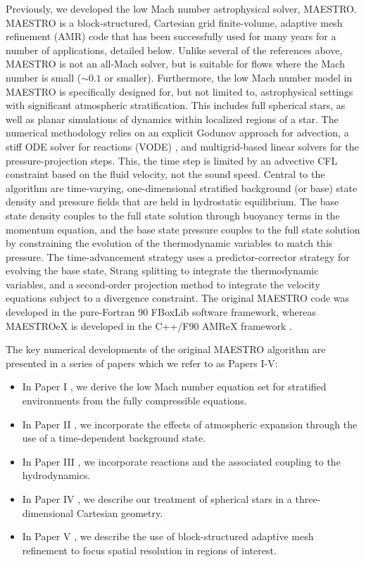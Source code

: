 Previously, we developed the low Mach number astrophysical solver, MAESTRO.
MAESTRO is a block-structured, Cartesian grid finite-volume, adaptive mesh refinement (AMR)
code that has been successfully used for many years for a number of applications, detailed below.
Unlike several of the references above, MAESTRO is not an all-Mach solver, but is suitable for
flows where the Mach number is small ($\sim 0.1$ or smaller).
Furthermore, the low Mach number model in MAESTRO is specifically designed for, but not limited
to, astrophysical settings with significant atmospheric stratification.
This includes full spherical stars, as well as planar simulations of dynamics within localized
regions of a star.
The numerical methodology relies on an explicit Godunov approach for advection, a stiff ODE
solver for reactions (VODE) \citep{vode}, and multigrid-based linear solvers for the
pressure-projection steps.  This,  the time step is limited by an advective CFL constraint based on the 
fluid velocity, not the sound speed.
Central to the algorithm are time-varying, one-dimensional stratified background (or base) state
density and pressure fields that are held in hydrostatic equilibrium.
The base state density couples to the full state solution through buoyancy terms in the momentum equation,
and the base state pressure couples to the full state solution by constraining the evolution of the
thermodynamic variables to match this pressure.
The time-advancement strategy uses a predictor-corrector strategy for evolving the base state,
Strang splitting to integrate the thermodynamic variables, and a
second-order projection method to integrate the velocity equations subject to a divergence constraint.
The original MAESTRO code was developed in the pure-Fortran 90 FBoxLib software framework, whereas
MAESTROeX is developed in the C++/F90 AMReX framework \citep{AMReX,AMReX_JOSS}.

The key numerical developments of the original MAESTRO algorithm are presented in a series of
papers which we refer to as Papers I-V:
\begin{itemize}
\item In Paper I \citep{MAESTRO_I}, we derive the low Mach number equation set for stratified
environments from the fully compressible equations.
\item In Paper II \citep{MAESTRO_II}, we incorporate the effects of atmospheric expansion
through the use of a time-dependent background state.
\item In Paper III \citep{MAESTRO_III}, we incorporate reactions and the associated coupling
to the hydrodynamics.
\item In Paper IV \citep{MAESTRO_IV}, we describe our treatment of spherical stars in a
three-dimensional Cartesian geometry.
\item In Paper V \citep{MAESTRO_V}, we describe the use of block-structured adaptive mesh
refinement to focus spatial resolution in regions of interest.
\end{itemize}

